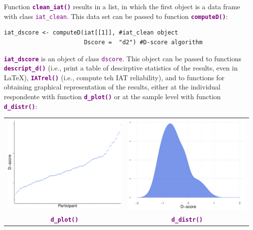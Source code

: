 \documentclass[a0,landscape]{a0poster}
\begin{document}
\begin{multicols*}{3}
Function \textbf{\textcolor{purple}{\texttt{clean\_iat()}}} results in a list, in which the first object is a data frame with class \textcolor{purple}{\texttt{iat\_clean}}. This data set can be passed to function \textbf{\textcolor{purple}{\texttt{computeD()}}}:
 \vspace{3mm}
\begin{lstlisting}
iat_dscore <- computeD(iat[[1]], #iat_clean object
                       Dscore =  "d2") #D-score algorithm
\end{lstlisting}
\vspace{3mm}

 \textbf{\textcolor{purple}{\texttt{iat\_dscore}}} is an object of class \textcolor{purple}{\texttt{dscore}}. This object can be passed to functions \textbf{\textcolor{purple}{\texttt{descript\_d()}}} (i.e., print a table of descirptive statistics of the results, even in \LaTeX), \textbf{\textcolor{purple}{\texttt{IATrel()}}} (i.e., compute teh IAT reliability), and to functions for obtaining graphical representation of the results, either at the individual respondente with function \textbf{\textcolor{purple}{\texttt{d\_plot()}}} or at the sample level with function \textbf{\textcolor{purple}{\texttt{d\_distr()}}}: 
\vspace{3mm}
		\begin{center}
			\begin{tabular}{c c}
				\includegraphics[width=0.40\linewidth]{dplot.pdf}
				&
				\includegraphics[width=0.40\linewidth]{ddistr.pdf} \\
				\textbf{\textcolor{purple}{\texttt{d\_plot()}}} & \textbf{\textcolor{purple}{\texttt{d\_distr()}}}\\
			\end{tabular}
		\end{center}
\vspace{3mm}


\end{multicols*}
\end{document}
